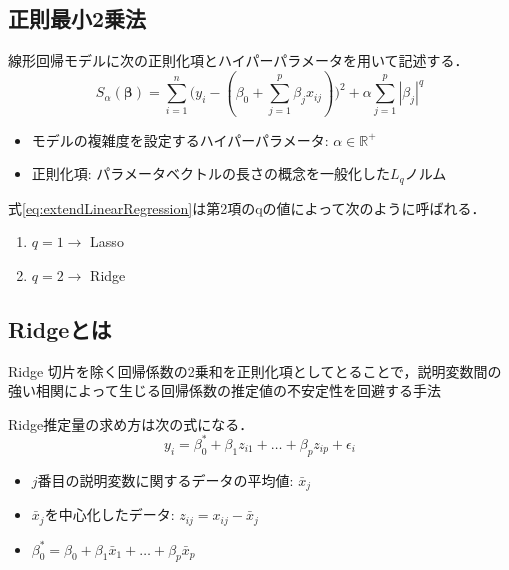 \documentclass[dvipdfmx, 10pt]{beamer}
\begin{document}
\subsection{正則最小2乗法}
\begin{frame}{\insertsubsection}
    線形回帰モデルに次の正則化項とハイパーパラメータを用いて記述する．
    \begin{equation}
    	S_{\alpha}(\bm{\beta}) = \sum_{i=1}^{n}\bigl(
    		y_i - (
    			\beta_0 + \sum_{j=1}^{p} \beta_j {x}_{ij}
    		)
    	\bigr)^2 + \alpha \sum_{j=1}^{p} |\beta_j|^q
    	\label{eq:extendLinearRegression}
    \end{equation}
    \begin{itemize}
        \item モデルの複雑度を設定するハイパーパラメータ: $\alpha \in \mathbb{R}^+$
        \item 正則化項: パラメータベクトルの長さの概念を一般化した$L_q$ノルム
     \end{itemize}
     \vspace{10pt}
    式\eqref{eq:extendLinearRegression}は第2項のqの値によって次のように呼ばれる．
    \begin{enumerate}
        \item $q=1 \rightarrow$ Lasso
        \item $q=2 \rightarrow$ Ridge
    \end{enumerate}
\end{frame}

\subsection{Ridgeとは}
\begin{frame}{\insertsubsection}
    \begin{block}{Ridge}
        切片を除く回帰係数の2乗和を正則化項としてとることで，説明変数間の強い相関によって生じる回帰係数の推定値の不安定性を回避する手法
    \end{block}
    \vspace{10pt}
    Ridge推定量の求め方は次の式になる．
    \begin{equation}
        y_i = \beta_0^* + \beta_1 z_{i1} + \dots + \beta_p z_{ip} + \epsilon_i
	\label{eq:linear_model_centering}
    \end{equation}
    \begin{itemize}
    	\item $j$番目の説明変数に関するデータの平均値: $\bar{x}_j$
	\item  $\bar{x}_j$を中心化したデータ: $z_{ij}=x_{ij} - \bar{x}_j$
	\item $\beta_0^* = \beta_0 + \beta_1 \bar{x}_{1} + \dots + \beta_p \bar{x}_{p}$
    \end{itemize}
\end{frame}
\end{document}
